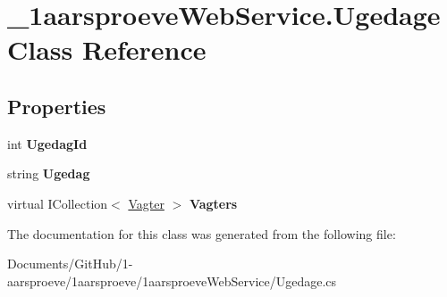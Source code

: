 \hypertarget{class__1aarsproeve_web_service_1_1_ugedage}{}\section{\+\_\+1aarsproeve\+Web\+Service.\+Ugedage Class Reference}
\label{class__1aarsproeve_web_service_1_1_ugedage}
\subsection*{Properties}
\begin{DoxyCompactItemize}
\item 
\hypertarget{class__1aarsproeve_web_service_1_1_ugedage_a49a50ddde4b9a8ea4a0c34bd9a14f940}{}int {\bfseries Ugedag\+Id}\label{class__1aarsproeve_web_service_1_1_ugedage_a49a50ddde4b9a8ea4a0c34bd9a14f940}

\item 
\hypertarget{class__1aarsproeve_web_service_1_1_ugedage_aae6519cbac17e134c26ad9a7ca1d1fd3}{}string {\bfseries Ugedag}\label{class__1aarsproeve_web_service_1_1_ugedage_aae6519cbac17e134c26ad9a7ca1d1fd3}

\item 
\hypertarget{class__1aarsproeve_web_service_1_1_ugedage_a32dbd21f4800d770e8eb42317387be1f}{}virtual I\+Collection$<$ \hyperlink{class__1aarsproeve_web_service_1_1_vagter}{Vagter} $>$ {\bfseries Vagters}\label{class__1aarsproeve_web_service_1_1_ugedage_a32dbd21f4800d770e8eb42317387be1f}

\end{DoxyCompactItemize}


The documentation for this class was generated from the following file\+:\begin{DoxyCompactItemize}
\item 
Documents/\+Git\+Hub/1-\/aarsproeve/1aarsproeve/1aarsproeve\+Web\+Service/Ugedage.\+cs\end{DoxyCompactItemize}
